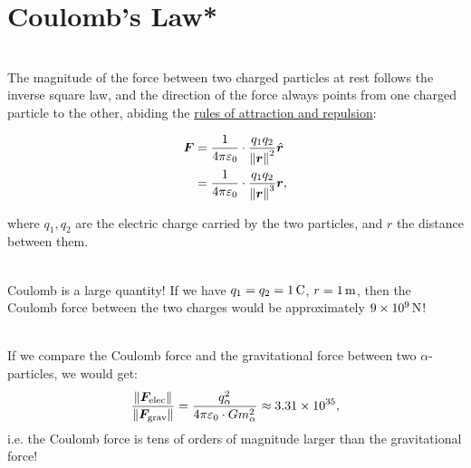 \section{Coulomb's Law*}
\begin{law}
    \ \\ The magnitude of the force between two charged particles at rest follows the inverse square law, and the direction of the force always points from one charged particle to the other, abiding the \hyperref[ppt: attract and repel]{rules of attraction and repulsion}: 

    \begin{minipage}{0.4 \linewidth}
        \begin{align*}
            \bm{F}&=\frac{1}{4\pi\varepsilon_0}\cdot\frac{q_1q_2}{\left\lVert \bm{r} \right\rVert^2}\hat{\bm{r}}\\&=\frac{1}{4\pi\varepsilon_0}\cdot\frac{q_1q_2}{\left\lVert \bm{r} \right\rVert^3}\bm{r}, 
        \end{align*}
    \end{minipage}
    \begin{minipage}{0.6 \linewidth}
        \centering
    \end{minipage}\vspace{1em}
    where $q_1, q_2$ are the electric charge carried by the two particles, and $r$ the distance between them.
    

\end{law}
\vspace{-12pt}
\begin{remark}
    \ \\Coulomb is a large quantity! If we have $q_1=q_2=1\,\rm{C}$, $r=1\,\rm{m}$, then the Coulomb force between the two charges would be approximately $9\times10^9\,\rm{N}$!
\end{remark}
\vspace{-12pt}
\begin{example}
    \ \\If we compare the Coulomb force and the gravitational force between two $\alpha$-particles, we would get:
    $$\frac{\lVert \bm{F}_{\rm{elec}} \rVert}{\lVert \bm{F}_{\rm{grav}} \rVert}=\frac{q_\alpha^2}{4\pi\varepsilon_0\cdot Gm_\alpha^2}\approx3.31\times10^{35},$$
    i.e. the Coulomb force is tens of orders of magnitude larger than the gravitational force!
\end{example}
